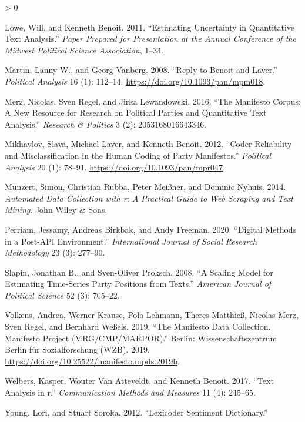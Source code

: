 \documentclass[
]{book}
\newlength{\cslhangindent}
\newenvironment{CSLReferences}[2] %
 {%
  \setlength{\parindent}{0pt}
  \ifodd #1 \everypar{\setlength{\hangindent}{\cslhangindent}}\ignorespaces\fi
  \ifnum #2 > 0
  \setlength{\parskip}{#2\baselineskip}
  \fi
 }%
 {}
\begin{document}
\begin{CSLReferences}{1}{0}
\leavevmode\hypertarget{ref-Lowe2011a}{}%
Lowe, Will, and Kenneth Benoit. 2011. {``Estimating Uncertainty in Quantitative Text Analysis.''} \emph{Paper Prepared for Presentation at the Annual Conference of the Midwest Political Science Association}, 1--34.

\leavevmode\hypertarget{ref-Martin2008a}{}%
Martin, Lanny W., and Georg Vanberg. 2008. {``Reply to Benoit and Laver.''} \emph{Political Analysis} 16 (1): 112--14. \url{https://doi.org/10.1093/pan/mpm018}.

\leavevmode\hypertarget{ref-Merz2016}{}%
Merz, Nicolas, Sven Regel, and Jirka Lewandowski. 2016. {``The Manifesto Corpus: A New Resource for Research on Political Parties and Quantitative Text Analysis.''} \emph{Research \& Politics} 3 (2): 2053168016643346.

\leavevmode\hypertarget{ref-Mikhaylov2012a}{}%
Mikhaylov, Slava, Michael Laver, and Kenneth Benoit. 2012. {``Coder Reliability and Misclassification in the Human Coding of Party Manifestos.''} \emph{Political Analysis} 20 (1): 78--91. \url{https://doi.org/10.1093/pan/mpr047}.

\leavevmode\hypertarget{ref-Munzert2014}{}%
Munzert, Simon, Christian Rubba, Peter Meißner, and Dominic Nyhuis. 2014. \emph{Automated Data Collection with r: A Practical Guide to Web Scraping and Text Mining}. John Wiley \& Sons.

\leavevmode\hypertarget{ref-Perriam2020}{}%
Perriam, Jessamy, Andreas Birkbak, and Andy Freeman. 2020. {``Digital Methods in a Post-API Environment.''} \emph{International Journal of Social Research Methodology} 23 (3): 277--90.

\leavevmode\hypertarget{ref-Slapin2008a}{}%
Slapin, Jonathan B., and Sven-Oliver Proksch. 2008. {``A Scaling Model for Estimating Time-Series Party Positions from Texts.''} \emph{American Journal of Political Science} 52 (3): 705--22.

\leavevmode\hypertarget{ref-Volkens2019a}{}%
Volkens, Andrea, Werner Krause, Pola Lehmann, Theres Matthieß, Nicolas Merz, Sven Regel, and Bernhard Weßels. 2019. {``{The Manifesto Data Collection. Manifesto Project (MRG/CMP/MARPOR)}.''} Berlin: Wissenschaftszentrum Berlin f{ü}r Sozialforschung (WZB). 2019. \url{https://doi.org/10.25522/manifesto.mpds.2019b}.

\leavevmode\hypertarget{ref-Welbers2017}{}%
Welbers, Kasper, Wouter Van Atteveldt, and Kenneth Benoit. 2017. {``Text Analysis in r.''} \emph{Communication Methods and Measures} 11 (4): 245--65.

\leavevmode\hypertarget{ref-Young2012}{}%
Young, Lori, and Stuart Soroka. 2012. {``Lexicoder Sentiment Dictionary.''}

\end{CSLReferences}
\end{document}
